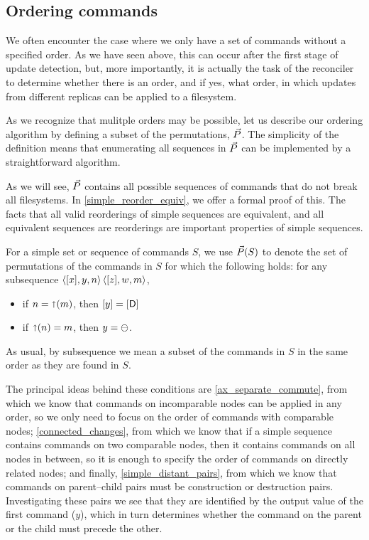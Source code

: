 
\subsection{Ordering commands}

We often encounter the case where we only have a set of commands without a specified order.
As we have seen above, this can occur after the first stage of update detection,
but, more importantly,
it is actually the task of the reconciler to determine whether there is an order,
and if yes, what order,
in which updates from different replicas can be applied to a filesystem.

As we recognize that mulitple orders may be possible,
let us describe our ordering algorithm by
defining a subset of the permutations, $\ordersetsign$.
The simplicity of the definition means that enumerating
all sequences in $\ordersetsign$ can be implemented by a straightforward
algorithm.

As we will see, $\ordersetsign$ contains all possible
sequences of commands that do not break all filesystems.
In \cref{simple_reorder_equiv}, we offer a formal proof of this.
The facts that all valid reorderings of simple sequences are equivalent,
and all equivalent sequences are reorderings are important 
properties of simple sequences.

\begin{mydef}[$\ordersetsign$]
For a simple set or sequence of commands $S$,
we use $\vec{P}({S})$ to denote the set of 
permutations of the commands in $S$
for which the following holds:
for any subsequence $\langle{[x],y,n}\rangle\,\langle{[z],w,m}\rangle$,
\begin{itemize}
\item if $n=\mathord{\shortuparrow}({m})$, then $[y]=[\mathsf{D}]$
\item if $\mathord{\shortuparrow}({n})=m$, then $y=\ominus$.
\end{itemize}
\end{mydef}

As usual, by subsequence we mean a subset of the commands in $S$ in the same order as they are found in $S$.

The principal ideas behind these conditions are 
\cref{ax_separate_commute}, from which we know that commands on incomparable
nodes can be applied in any order, so we only need to focus on the order of commands
with comparable nodes;
\cref{connected_changes}, from which we know that if a simple sequence contains commands on two comparable
nodes, then it contains commands on all nodes in between, so it is enough to specify
the order of commands on directly related nodes;
and finally, \cref{simple_distant_pairs}, from which we know
that commands on parent--child pairs must be construction or destruction pairs.
Investigating these pairs we see that they are identified by the output value of the first command ($y$),
which in turn determines whether the command on the parent or the child must precede the other.

